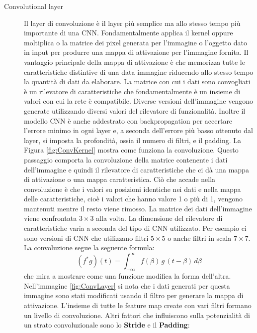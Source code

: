 \begin{description}
    \item[Convolutional layer] Il layer di convoluzione è il layer più semplice ma allo stesso tempo più 
    importante di una CNN.
    Fondamentalmente applica il kernel oppure moltiplica o la matrice dei pixel generata per l'immagine o 
    l'oggetto dato in input per produrre una mappa di attivazione per l'immagine fornita. Il vantaggio 
    principale della mappa di attivazione è che memorizza tutte le caratteristiche distintive di una data 
    immagine riducendo allo stesso tempo la quantità di dati da elaborare.
    La matrice con cui i dati sono convogliati è un rilevatore di caratteristiche che fondamentalmente è un 
    insieme di valori con cui la rete è compatibile.
    Diverse versioni dell'immagine vengono generate utilizzando diversi valori del rilevatore di funzionalità.
    Inoltre il modello CNN è anche addestrato con backpropagation per accertare l'errore minimo in ogni layer e,
    a seconda dell'errore più basso ottenuto dal layer, si imposta la profondità, ossia il numero di filtri, e 
    il padding.
    La Figura \ref{fig:ConvKernel} mostra come funziona la convoluzione. 
    Questo passaggio comporta la convoluzione della matrice contenente i dati dell'immagine e quindi il 
    rilevatore di caratteristiche che ci dà una mappa di attivazione o una mappa caratteristica. 
    Ciò che accade nella convoluzione è che i valori su posizioni identiche nei dati e nella mappa delle
    caratteristiche, cioè i valori che hanno valore 1 o più di 1, vengono mantenuti mentre il resto viene rimosso.
    La matrice dei dati dell'immagine viene confrontata $3 \times 3$ alla volta. 
    La dimensione del rilevatore di caratteristiche varia a seconda del tipo di CNN utilizzato. 
    Per esempio ci sono versioni di CNN che utilizzano filtri $5 \times 5$ o anche filtri in scala $7 \times 7$. 
    La convoluzione segue la seguente formula: 
    \[
        (f ^{\ast} g)(t) = \int_{-\infty}^{\infty} f(\beta)\,g\,(t - \beta)\,d \beta
    \]
    che mira a mostrare come una funzione modifica la forma dell'altra. Nell'immagine \ref{fig:ConvLayer} 
    si nota che i dati generati per questa immagine sono stati modificati usando il filtro per generare la 
    mappa di attivazione. 
    L'insieme di tutte le feature map create con vari filtri formano un livello di convoluzione. Altri fattori 
    che influiscono sulla potenzialità di un strato convoluzionale sono lo \textbf{Stride} e il \textbf{Padding}:
    \begin{description}

\end{description}
\end{description}
